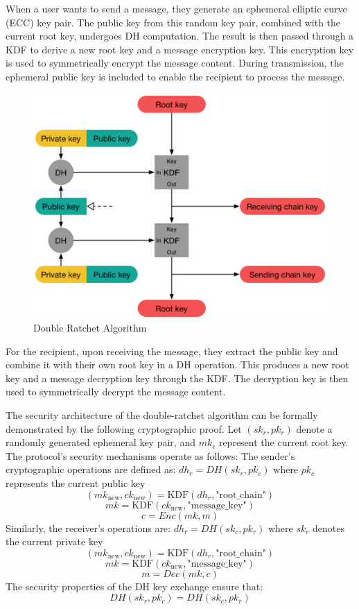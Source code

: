 \documentclass[9pt,a4paper,twoside]{rho-class/rho}
\begin{document}
When a user wants to send a message, they generate an ephemeral elliptic curve (ECC) key pair. The public key from this random key pair, combined with the current root key, undergoes DH computation. The result is then passed through a KDF to derive a new root key and a message encryption key. This encryption key is used to symmetrically encrypt the message content. During transmission, the ephemeral public key is included to enable the recipient to process the message.
\begin{figure}[H]
    \centering
    \includegraphics[width=\linewidth]{figures/Double_Ratchet_Algorithm.png}
    \caption{Double Ratchet Algorithm \cite{Double_Ratchet_Algorithm}}
    \label{fig:4}
\end{figure}

For the recipient, upon receiving the message, they extract the public key and combine it with their own root key in a DH operation. This produces a new root key and a message decryption key through the KDF. The decryption key is then used to symmetrically decrypt the message content.

The security architecture of the double-ratchet algorithm can be formally demonstrated by the following cryptographic proof. Let $(sk_r, pk_r)$ denote a randomly generated ephemeral key pair, and $mk_c$ represent the current root key. The protocol's security mechanisms operate as follows:
The sender's cryptographic operations are defined as:
$dh_r = DH(sk_r, pk_c)$ where $pk_c$ represents the current public key
\[
(mk_{\text{new}}, ck_{\text{new}}) = \text{KDF}(dh_r, \text{"root\_chain"})
\]
\[
mk = \text{KDF}(ck_{\text{new}}, \text{"message\_key"})
\]
\[ c = Enc(mk, m) \]
Similarly, the receiver's operations are:
$dh_r = DH(sk_c, pk_r)$ where $sk_c$ denotes the current private key
\[
(mk_{\text{new}}, ck_{\text{new}}) = \text{KDF}(dh_r, \text{"root\_chain"})
\]
\[
mk = \text{KDF}(ck_{\text{new}}, \text{"message\_key"})
\]
\[
m = Dec(mk, c)
\]
The security properties of the DH key exchange ensure that:
\[
DH(sk_r, pk_c) = DH(sk_c, pk_r)
\]
\end{document}
